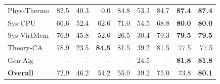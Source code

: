 \begin{table}[t]
\begin{tabular}{lrrrrrrrr}
    Phys-Thermo & 82.5 & 40.3 & 0.0 & 84.8 & 53.3 & 84.7 & \textbf{87.4} & \textbf{87.4} \\
    Sys-CPU & 66.6 & 52.4 & 62.6 & 71.0 & 54.5 & 68.8 & \textbf{80.0} & \textbf{80.0} \\
    Sys-VirtMem & 76.9 & 45.8 & 52.6 & 26.5 & 30.4 & 79.3 & \textbf{79.5} & \textbf{79.5} \\
    Theory-CA & 78.9 & 23.5 & \textbf{84.5} & 81.5 & 39.2 & 81.5 & 77.5 & 77.5 \\
    Gen-Alg & -- & -- & -- & -- & 24.5 & -- & \textbf{81.8} & \textbf{81.8} \\
    \midrule
    \textbf{Overall} & 72.9 & 46.2 & 54.2 & 55.0 & 39.2 & 75.0 & 73.8 & \textbf{80.1} \\
    \bottomrule
  \end{tabular}
\end{table}
